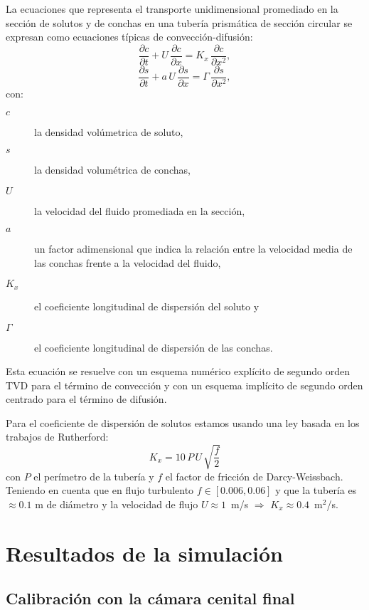 \documentclass[a4paper]{article}
\begin{document}
La ecuaciones que representa el transporte unidimensional promediado en la
sección de solutos y de conchas en una tubería prismática de sección circular se
expresan como ecuaciones típicas de convección-difusión:
\[
\frac{\partial c}{\partial t}+U\,\frac{\partial c}{\partial x}=
K_x\,\frac{\partial c}{\partial x^2},
\]
\begin{equation}
\frac{\partial s}{\partial t}+a\,U\,\frac{\partial s}{\partial x}=
\Gamma\,\frac{\partial s}{\partial x^2},
\end{equation}
con:
\begin{description}
\item[$c$] la densidad volúmetrica de soluto,
\item[$s$] la densidad volumétrica de conchas,
\item[$U$] la velocidad del fluido promediada en la sección,
\item[$a$] un factor adimensional que indica la relación entre la velocidad
media de las conchas frente a la velocidad del fluido,
\item[$K_x$] el coeficiente longitudinal de dispersión del soluto y
\item[$\Gamma$] el coeficiente longitudinal de dispersión de las conchas.
\end{description}

Esta ecuación se resuelve con un esquema numérico explícito de segundo orden TVD
para el término de convección y con un esquema implícito de segundo orden
centrado para el término de difusión.

Para el coeficiente de dispersión de solutos estamos usando una ley basada en
los trabajos de Rutherford:
\begin{equation}
K_x=10\,P\,U\,\sqrt{\frac{f}{2}}
\end{equation}
con $P$ el perímetro de la tubería y $f$ el factor de fricción de
Darcy-Weissbach. Teniendo en cuenta que en flujo turbulento $f\in[0.006,0.06]$ y
que la tubería es $\approx0.1$ m de diámetro y la velocidad de flujo
$U\approx1$~m/s $\Rightarrow$ $K_x\approx0.4$~m$^2$/s.

\section{Resultados de la simulación}

\subsection{Calibración con la cámara cenital final}
\end{document}

